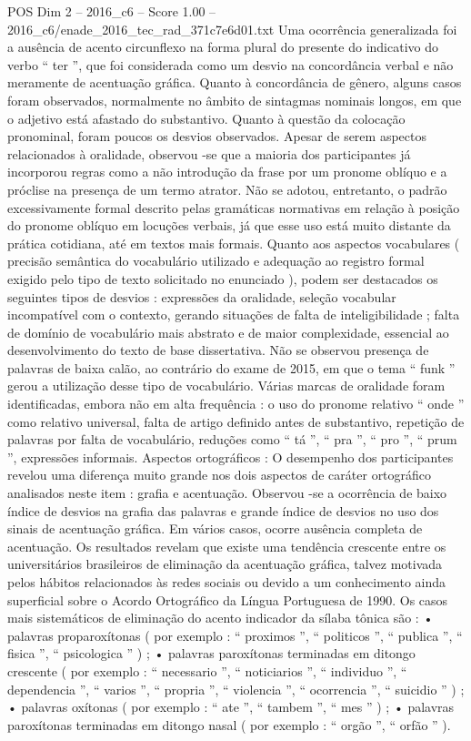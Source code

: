 \begin{textsample}{POS Dim 2 – 2016\_c6 – Score 1.00 – 2016\_c6/enade\_2016\_tec\_rad\_371c7e6d01.txt}
Uma ocorrência generalizada foi a ausência de acento circunflexo na forma plural do presente do indicativo do verbo “ ter ”, que foi considerada como um desvio na concordância verbal e não meramente de acentuação gráfica.
Quanto à concordância de gênero, alguns casos foram observados, normalmente no âmbito de sintagmas nominais longos, em que o adjetivo está afastado do substantivo.
Quanto à questão da colocação pronominal, foram poucos os desvios observados.
Apesar de serem aspectos relacionados à oralidade, observou -se que a maioria dos participantes já incorporou regras como a não introdução da frase por um pronome oblíquo e a próclise na presença de um termo atrator.
Não se adotou, entretanto, o padrão excessivamente formal descrito pelas gramáticas normativas em relação à posição do pronome oblíquo em locuções verbais, já que esse uso está muito distante da prática cotidiana, até em textos mais formais.
Quanto aos aspectos vocabulares ( precisão semântica do vocabulário utilizado e adequação ao registro formal exigido pelo tipo de texto solicitado no enunciado ), podem ser destacados os seguintes tipos de desvios : expressões da oralidade, seleção vocabular incompatível com o contexto, gerando situações de falta de inteligibilidade ; falta de domínio de vocabulário mais abstrato e de maior complexidade, essencial ao desenvolvimento do texto de base dissertativa.
Não se observou presença de palavras de baixa calão, ao contrário do exame de 2015, em que o tema “ funk ” gerou a utilização desse tipo de vocabulário.
Várias marcas de oralidade foram identificadas, embora não em alta frequência : o uso do pronome relativo “ onde ” como relativo universal, falta de artigo definido antes de substantivo, repetição de palavras por falta de vocabulário, reduções como “ tá ”, “ pra ”, “ pro ”, “ prum ”, expressões informais.
Aspectos ortográficos : O desempenho dos participantes revelou uma diferença muito grande nos dois aspectos de caráter ortográfico analisados neste item : grafia e acentuação.
Observou -se a ocorrência de baixo índice de desvios na grafia das palavras e grande índice de desvios no uso dos sinais de acentuação gráfica.
Em vários casos, ocorre ausência completa de acentuação.
Os resultados revelam que existe uma tendência crescente entre os universitários brasileiros de eliminação da acentuação gráfica, talvez motivada pelos hábitos relacionados às redes sociais ou devido a um conhecimento ainda superficial sobre o Acordo Ortográfico da Língua Portuguesa de 1990.
Os casos mais sistemáticos de eliminação do acento indicador da sílaba tônica são : • palavras proparoxítonas ( por exemplo : “ proximos ”, “ politicos ”, “ publica ”, “ fisica ”, “ psicologica ” ) ; • palavras paroxítonas terminadas em ditongo crescente ( por exemplo : “ necessario ”, “ noticiarios ”, “ individuo ”, “ dependencia ”, “ varios ”, “ propria ”, “ violencia ”, “ ocorrencia ”, “ suicidio ” ) ; • palavras oxítonas ( por exemplo : “ ate ”, “ tambem ”, “ mes ” ) ; • palavras paroxítonas terminadas em ditongo nasal ( por exemplo : “ orgão ”, “ orfão ” ).

\end{textsample}
